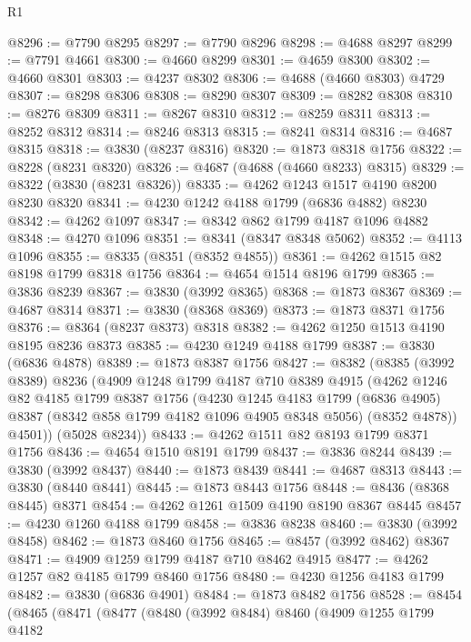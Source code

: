 \begin{lexlean}{R1}
\begin{coremodule}
@8296 := @7790 @8295
@8297 := @7790 @8296
@8298 := @4688 @8297
@8299 := @7791 @4661
@8300 := @4660 @8299
@8301 := @4659 @8300
@8302 := @4660 @8301
@8303 := @4237 @8302
@8306 := @4688 (@4660 @8303) @4729
@8307 := @8298 @8306
@8308 := @8290 @8307
@8309 := @8282 @8308
@8310 := @8276 @8309
@8311 := @8267 @8310
@8312 := @8259 @8311
@8313 := @8252 @8312
@8314 := @8246 @8313
@8315 := @8241 @8314
@8316 := @4687 @8315
@8318 := @3830 (@8237 @8316)
@8320 := @1873 @8318 @1756
@8322 := @8228 (@8231 @8320)
@8326 := @4687 (@4688 (@4660 @8233) @8315)
@8329 := @8322 (@3830 (@8231 @8326))
@8335 := @4262 @1243 @1517 @4190 @8200 @8230 @8320
@8341 := @4230 @1242 @4188 @1799 (@6836 @4882) @8230
@8342 := @4262 @1097
@8347 := @8342 @862 @1799 @4187 @1096 @4882
@8348 := @4270 @1096
@8351 := @8341 (@8347 @8348 @5062)
@8352 := @4113 @1096
@8355 := @8335 (@8351 (@8352 @4855))
@8361 := @4262 @1515 @82 @8198 @1799 @8318 @1756
@8364 := @4654 @1514 @8196 @1799
@8365 := @3836 @8239
@8367 := @3830 (@3992 @8365)
@8368 := @1873 @8367
@8369 := @4687 @8314
@8371 := @3830 (@8368 @8369)
@8373 := @1873 @8371 @1756
@8376 := @8364 (@8237 @8373) @8318
@8382 := @4262 @1250 @1513 @4190 @8195 @8236 @8373
@8385 := @4230 @1249 @4188 @1799
@8387 := @3830 (@6836 @4878)
@8389 := @1873 @8387 @1756
@8427 := @8382
    (@8385
      (@3992 @8389)
      @8236
      (@4909
        @1248
        @1799
        @4187
        @710
        @8389
        @4915
        (@4262
          @1246
          @82
          @4185
          @1799
          @8387
          @1756
          (@4230
            @1245
            @4183
            @1799
            (@6836 @4905)
            @8387
            (@8342 @858 @1799 @4182 @1096 @4905 @8348 @5056)
            (@8352 @4878))
          @4501))
      (@5028 @8234))
@8433 := @4262 @1511 @82 @8193 @1799 @8371 @1756
@8436 := @4654 @1510 @8191 @1799
@8437 := @3836 @8244
@8439 := @3830 (@3992 @8437)
@8440 := @1873 @8439
@8441 := @4687 @8313
@8443 := @3830 (@8440 @8441)
@8445 := @1873 @8443 @1756
@8448 := @8436 (@8368 @8445) @8371
@8454 := @4262 @1261 @1509 @4190 @8190 @8367 @8445
@8457 := @4230 @1260 @4188 @1799
@8458 := @3836 @8238
@8460 := @3830 (@3992 @8458)
@8462 := @1873 @8460 @1756
@8465 := @8457 (@3992 @8462) @8367
@8471 := @4909 @1259 @1799 @4187 @710 @8462 @4915
@8477 := @4262 @1257 @82 @4185 @1799 @8460 @1756
@8480 := @4230 @1256 @4183 @1799
@8482 := @3830 (@6836 @4901)
@8484 := @1873 @8482 @1756
@8528 := @8454
    (@8465
      (@8471
        (@8477
          (@8480
            (@3992 @8484)
            @8460
            (@4909
              @1255
              @1799
              @4182

\end{coremodule}
\end{lexlean}
